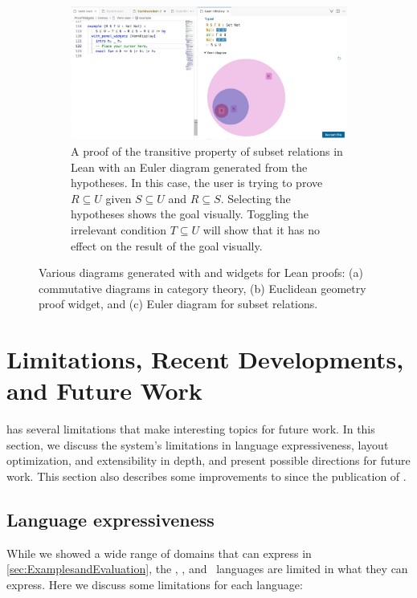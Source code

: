 \begin{figure}[h!]
    \begin{subfigure}{\textwidth}
        \centering
        \includegraphics[width=.8\textwidth]{assets/lean-venn.pdf}
        \caption{A proof of the transitive property of subset relations in Lean with an Euler diagram generated from the hypotheses. In this case, the user is trying to prove $R \subseteq U$ given $S \subseteq U$ and $R \subseteq S$. Selecting the hypotheses shows the goal visually. Toggling the irrelevant condition $T \subseteq U$ will show that it has no effect on the result of the goal visually.}
        \label{fig:lean-venn}
    \end{subfigure}
    
    \caption{Various diagrams generated with \Penrose{} and widgets for Lean proofs: (a) commutative diagrams in category theory, (b) Euclidean geometry proof widget, and (c) Euler diagram for subset relations.}
    \label{fig:lean-combined}
\end{figure}


\section{Limitations, Recent Developments, and Future Work}
\label{sec:penrose-limitations}

\Penrose{} has several limitations that make interesting topics for future work. In this section, we discuss the system's limitations in language expressiveness, layout optimization, and extensibility in depth, and present possible directions for future work. This section also describes some improvements to \Penrose{} since the publication of \cite{penrose}.

\subsection{Language expressiveness}

While we showed a wide range of domains that \Penrose{} can express in \cref{sec:ExamplesandEvaluation}, the \Domain, \Substance, and \Style\ languages are limited in what they can express. Here we discuss some limitations for each language:

